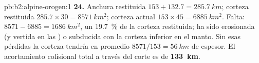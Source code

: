\begin{solution}{pb:b2:alpine-orogen:1}
\textbf{24.} Anchura restituida $153 + 132.7 = \qty{285.7}{km}$; corteza restituida
$285.7\times30 = \qty{8571}{km^2}$; corteza actual $153\times45 = \qty{6885}{km^2}$. Falta:
$8571 - 6885 = \qty{1686}{km^2}$, un \qty{19.7}{\percent} de la corteza restituida; ha sido
erosionada (y vertida en las ) o subducida con la corteza inferior en el
manto. Sin esas pérdidas la corteza tendría en promedio $8571/153 = \qty{56}{km}$ de espesor.
El acortamiento colisional total a través del corte es de
\textbf{\qty[text-series-to-math=true]{133}{km}}.
\end{solution}
